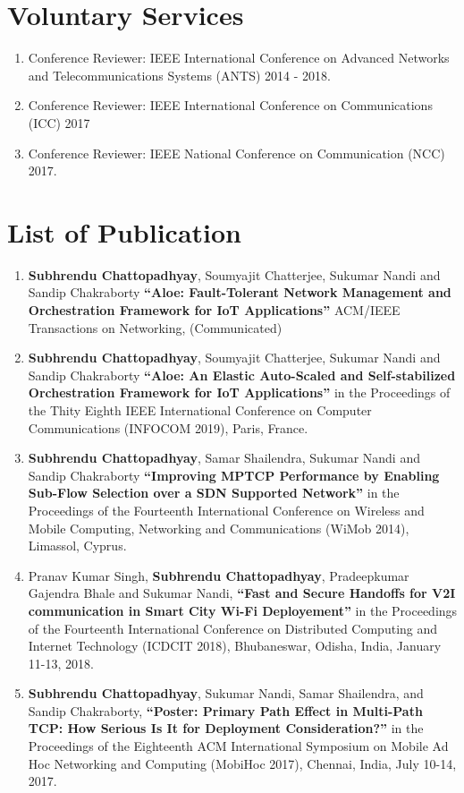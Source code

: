 \documentclass{res}
\newcommand{\papertitle}[1]{\textbf{ ``#1''}}
\begin{document}
\begin{resume}
\section{Voluntary Services}
  \begin{enumerate}
   \item Conference Reviewer: IEEE International Conference on Advanced Networks and Telecommunications Systems (ANTS) 2014 - 2018.
   \item Conference Reviewer: IEEE  International Conference on Communications (ICC) 2017
   \item Conference Reviewer: IEEE National Conference on Communication (NCC) 2017.
  \end{enumerate}
\section{List of Publication} 
	\begin{enumerate}
        \item {\bf Subhrendu Chattopadhyay}, Soumyajit Chatterjee, Sukumar Nandi and Sandip Chakraborty \papertitle{Aloe: Fault-Tolerant Network Management and Orchestration Framework for IoT Applications} ACM/IEEE Transactions on Networking, (Communicated)
        \item  {\bf Subhrendu Chattopadhyay}, Soumyajit Chatterjee, Sukumar Nandi and Sandip Chakraborty \papertitle{Aloe: An Elastic Auto-Scaled and Self-stabilized Orchestration Framework for IoT Applications} in the Proceedings of the Thity Eighth IEEE International Conference on Computer Communications (INFOCOM 2019), Paris, France.
        \item {\bf Subhrendu Chattopadhyay}, Samar Shailendra, Sukumar Nandi and Sandip Chakraborty \papertitle{Improving MPTCP Performance by Enabling Sub-Flow Selection over a SDN Supported Network} in the Proceedings of the Fourteenth International Conference on Wireless and Mobile Computing, Networking and Communications (WiMob 2014), Limassol, Cyprus. 
		\item Pranav Kumar Singh, {\bf Subhrendu Chattopadhyay}, Pradeepkumar Gajendra Bhale and Sukumar Nandi, \papertitle{Fast and Secure Handoffs for V2I communication in Smart City Wi-Fi Deployement} in the Proceedings of the Fourteenth International Conference on Distributed Computing and Internet Technology (ICDCIT 2018), Bhubaneswar, Odisha, India, January 11-13, 2018. 
		\item {\bf Subhrendu Chattopadhyay}, Sukumar Nandi, Samar Shailendra, and Sandip Chakraborty,\papertitle{Poster: Primary Path Effect in Multi-Path TCP: How Serious Is It for Deployment Consideration?} in the Proceedings of the Eighteenth ACM International Symposium on Mobile Ad Hoc Networking and Computing (MobiHoc 2017), Chennai, India, July 10-14, 2017. 

\end{enumerate}
\end{resume}
\end{document}
